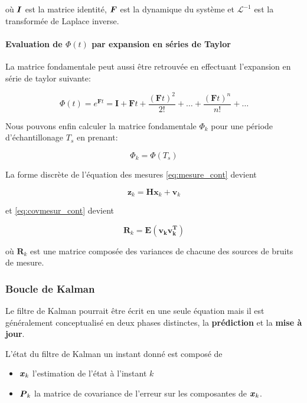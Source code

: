 \documentclass[12pt,a4paper]{report}
\begin{document}
	\para où $\boldsymbol{I}$ est la matrice identité, $\boldsymbol{F}$ est la dynamique du système et $\mathcal{L}^{-1}$ est la transformée de Laplace inverse.
	
	\paragraph*{Evaluation de $\Phi(t)$ par expansion en séries de Taylor}
	\para La matrice fondamentale peut aussi être retrouvée en effectuant l'expansion en série de taylor suivante:
	
	\begin{equation}
	 \Phi(t) = e^{\boldsymbol Ft} = \boldsymbol I + \boldsymbol Ft + \frac{(\boldsymbol Ft)^2}{2!} + \dots + \frac{(\boldsymbol Ft)^n}{n!} + \dots
	\end{equation}
	
	\para Nous pouvons enfin calculer la matrice fondamentale $\Phi_k$ pour une période d'échantillonage $T_s$ en prenant:
	
	\begin{equation}
	\Phi_k = \Phi(T_s)
	\end{equation}
	
	\para La forme discrète de l'équation des mesures \ref{eq:mesure_cont} devient
	
	\begin{equation}
	 \boldsymbol z_k = \boldsymbol H \boldsymbol x_k +\boldsymbol  v_k
	\end{equation}
	
	\para et \ref{eq:covmesur_cont} devient
	
	\begin{equation}
	  \boldsymbol R_k = \boldsymbol{E(v_k v_k^T)}
	\end{equation}

	\para où $\boldsymbol R_k$ est une matrice composée des variances de chacune des sources de bruits de mesure.
	
	\subsubsection{Boucle de Kalman}
	\label{sec:boucledekalman}
	
	Le filtre de Kalman pourrait être écrit en une seule équation mais il est généralement conceptualisé en deux phases distinctes, la \textbf{prédiction} et la \textbf{mise à jour}.
	
	\para L'état du filtre de Kalman un instant donné est composé de \begin{itemize}
		\item $\boldsymbol{x}_k$ l'estimation de l'état à l'instant $k$
		\item $\boldsymbol{P}_k$ la matrice de covariance de l'erreur sur les composantes de $\boldsymbol{x}_k$.
	\end{itemize}
\end{document}
